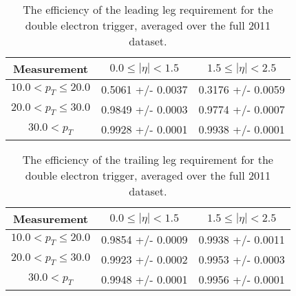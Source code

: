 \label{app:efficiency_studies_trigger}

 \begin{table}[!ht]
 \begin{center} 
 \begin{tabular}{|c|c|c|}
 \hline
 Measurement &  $  0.0  \le |\eta| <   1.5$ & $  1.5  \le |\eta| <   2.5$ \\ 
 \hline           
$ 10.0 < p_{T} \le  20.0$ &     0.5061 +/- 0.0037  &      0.3176 +/- 0.0059 \\ 
\hline
$ 20.0 < p_{T} \le  30.0$ &     0.9849 +/- 0.0003  &      0.9774 +/- 0.0007 \\ 
\hline
$ 30.0 < p_{T} $ &     0.9928 +/- 0.0001  &      0.9938 +/- 0.0001 \\ 
\hline
\end{tabular}
\caption{The efficiency of the leading leg requirement for the double electron trigger, averaged over the full 2011 dataset.}
\label{tab:eff_trigger_doubleEle_leadingleg}
\end{center}
\end{table}


 \begin{table}[!ht]
 \begin{center} 
 \begin{tabular}{|c|c|c|}
 \hline
 Measurement &  $  0.0  \le |\eta| <   1.5$ & $  1.5  \le |\eta| <   2.5$ \\ 
 \hline           
$ 10.0 < p_{T} \le  20.0$ &     0.9854 +/- 0.0009  &      0.9938 +/- 0.0011 \\ 
\hline
$ 20.0 < p_{T} \le  30.0$ &     0.9923 +/- 0.0002  &      0.9953 +/- 0.0003 \\ 
\hline
$ 30.0 < p_{T} $ &     0.9948 +/- 0.0001  &      0.9956 +/- 0.0001 \\ 
\hline
\end{tabular}
\caption{The efficiency of the trailing leg requirement for the double electron trigger, averaged over the full 2011 dataset.}
\label{tab:eff_trigger_doubleEle_trailingleg}
\end{center}
\end{table}




